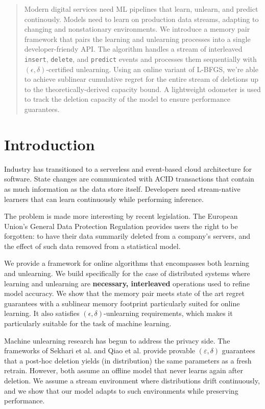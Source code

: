 \documentclass[a4paper,12pt]{article}
\begin{document}
\begin{abstract}

Modern digital services need ML pipelines that learn, unlearn, and predict continously. Models need to learn on production data streams, adapting to changing and nonstationary environments. We introduce a memory pair framework that pairs the learning and unlearning processes into a single developer-friendy API. The algorithm handles a stream of interleaved \texttt{insert}, \texttt{delete}, and \texttt{predict} events and processes them sequentially with $(\epsilon, \delta)$-certified unlearning. Using an online variant of L-BFGS, we're able to achieve sublinear cumulative regret for the entire stream of deletions up to the theoretically-derived capacity bound. A lightweight odometer is used to track the deletion capacity of the model to ensure performance guarantees.

\end{abstract}


\section{Introduction}
\label{sec:intro}

Industry has transitioned to a serverless and event-based cloud architecture for software. State changes are communicated with ACID transactions that contain as much information as the data store itself. Developers need stream-native learners that can learn continuously while performing inference.

The problem is made more interesting by recent legislation. The European Union's General Data Protection Regulation provides users the right to be forgotten: to have their data summarily deleted from a company's servers, and the effect of such data removed from a statistical model.

We provide a framework for online algorithms that encompasses both learning and unlearning. We build specifically for the case of distributed systems where learning and unlearning are \textbf{necessary, interleaved} operations used to refine model accuracy. We show that the memory pair meets state of the art regret guarantees with a sublinear memory footprint particularly suited for online learning. It also satisfies $(\epsilon,\delta)$-unlearning requirements, which makes it particularly suitable for the task of machine learning.

Machine unlearning research has begun to address the privacy side.  The frameworks of Sekhari et al. and Qiao et al. provide provable $(\varepsilon,\delta)$ guarantees that a post-hoc deletion yields (in distribution) the same parameters as a fresh retrain.  However, both assume an offline model that never learns again after deletion. We assume a stream environment where distributions drift continuously, and we show that our model adapts to such environments while preserving performance.
\end{document}
